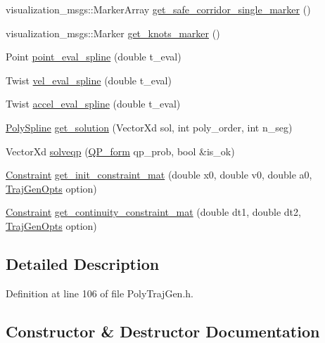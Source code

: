 \begin{DoxyCompactItemize}
\item 
visualization\+\_\+msgs\+::\+Marker\+Array \hyperlink{class_path_planner_a5d4db201bdb6b20bf6a9a46a15c354e2}{get\+\_\+safe\+\_\+corridor\+\_\+single\+\_\+marker} ()
\item 
visualization\+\_\+msgs\+::\+Marker \hyperlink{class_path_planner_a5c9fd37284fa20b93f933ce53c932fc6}{get\+\_\+knots\+\_\+marker} ()
\item 
Point \hyperlink{class_path_planner_aa12888c52d7cb2d429c3782060b9b45e}{point\+\_\+eval\+\_\+spline} (double t\+\_\+eval)
\item 
Twist \hyperlink{class_path_planner_ae31bac84392ea0fbe59edfc7582215e0}{vel\+\_\+eval\+\_\+spline} (double t\+\_\+eval)
\item 
Twist \hyperlink{class_path_planner_ad1ad0eb3d19d6f1e9ab921e835361c14}{accel\+\_\+eval\+\_\+spline} (double t\+\_\+eval)
\item 
\hyperlink{class_poly_spline}{Poly\+Spline} \hyperlink{class_path_planner_a35e8872f5ffc5fc3227dc45f9f969a85}{get\+\_\+solution} (Vector\+Xd sol, int poly\+\_\+order, int n\+\_\+seg)
\item 
Vector\+Xd \hyperlink{class_path_planner_a6fd581289799d1daac012050fb712a0c}{solveqp} (\hyperlink{struct_q_p__form}{Q\+P\+\_\+form} qp\+\_\+prob, bool \&is\+\_\+ok)
\item 
\hyperlink{struct_constraint}{Constraint} \hyperlink{class_path_planner_a1d6a959095513585bfc10468f7b8d180}{get\+\_\+init\+\_\+constraint\+\_\+mat} (double x0, double v0, double a0, \hyperlink{struct_traj_gen_opts}{Traj\+Gen\+Opts} option)
\item 
\hyperlink{struct_constraint}{Constraint} \hyperlink{class_path_planner_aff99e738bd54babad38867d7713e5a51}{get\+\_\+continuity\+\_\+constraint\+\_\+mat} (double dt1, double dt2, \hyperlink{struct_traj_gen_opts}{Traj\+Gen\+Opts} option)
\end{DoxyCompactItemize}


\subsection{Detailed Description}


Definition at line 106 of file Poly\+Traj\+Gen.\+h.



\subsection{Constructor \& Destructor Documentation}
